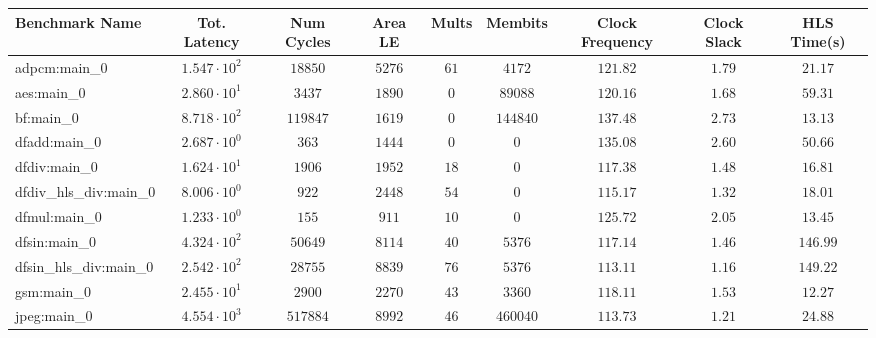 \begin{tabular}{|l|c|c|c|c|c|c|c|c|}
\hline
Benchmark Name          & Tot. Latency           & Num Cycles & Area LE   & Mults   & Membits    & Clock Frequency & Clock Slack & HLS Time(s) \\
\hline
adpcm:main\_0           & $ 1.547 \cdot 10^{2} $ & $ 18850  $ & $ 5276  $ & $ 61  $ & $ 4172   $ & $ 121.82      $ & $ 1.79    $ & $ 21.17   $ \\
aes:main\_0             & $ 2.860 \cdot 10^{1} $ & $ 3437   $ & $ 1890  $ & $ 0   $ & $ 89088  $ & $ 120.16      $ & $ 1.68    $ & $ 59.31   $ \\
bf:main\_0              & $ 8.718 \cdot 10^{2} $ & $ 119847 $ & $ 1619  $ & $ 0   $ & $ 144840 $ & $ 137.48      $ & $ 2.73    $ & $ 13.13   $ \\
dfadd:main\_0           & $ 2.687 \cdot 10^{0} $ & $ 363    $ & $ 1444  $ & $ 0   $ & $ 0      $ & $ 135.08      $ & $ 2.60    $ & $ 50.66   $ \\
dfdiv:main\_0           & $ 1.624 \cdot 10^{1} $ & $ 1906   $ & $ 1952  $ & $ 18  $ & $ 0      $ & $ 117.38      $ & $ 1.48    $ & $ 16.81   $ \\
dfdiv\_hls\_div:main\_0 & $ 8.006 \cdot 10^{0} $ & $ 922    $ & $ 2448  $ & $ 54  $ & $ 0      $ & $ 115.17      $ & $ 1.32    $ & $ 18.01   $ \\
dfmul:main\_0           & $ 1.233 \cdot 10^{0} $ & $ 155    $ & $ 911   $ & $ 10  $ & $ 0      $ & $ 125.72      $ & $ 2.05    $ & $ 13.45   $ \\
dfsin:main\_0           & $ 4.324 \cdot 10^{2} $ & $ 50649  $ & $ 8114  $ & $ 40  $ & $ 5376   $ & $ 117.14      $ & $ 1.46    $ & $ 146.99  $ \\
dfsin\_hls\_div:main\_0 & $ 2.542 \cdot 10^{2} $ & $ 28755  $ & $ 8839  $ & $ 76  $ & $ 5376   $ & $ 113.11      $ & $ 1.16    $ & $ 149.22  $ \\
gsm:main\_0             & $ 2.455 \cdot 10^{1} $ & $ 2900   $ & $ 2270  $ & $ 43  $ & $ 3360   $ & $ 118.11      $ & $ 1.53    $ & $ 12.27   $ \\
jpeg:main\_0            & $ 4.554 \cdot 10^{3} $ & $ 517884 $ & $ 8992  $ & $ 46  $ & $ 460040 $ & $ 113.73      $ & $ 1.21    $ & $ 24.88   $ \\

\end{tabular}
